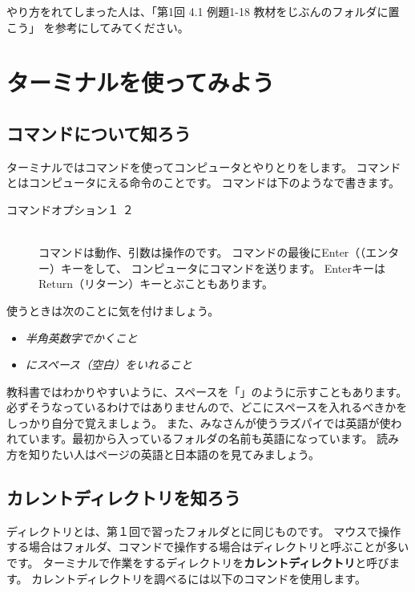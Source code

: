 やり方をれてしまった人は、「第1回 4.1 例題1-18 教材をじぶんのフォルダに置こう」 を参考にしてみてください。

\section{ターミナルを使ってみよう}
\subsection{コマンドについて知ろう}

ターミナルではコマンドを使ってコンピュータとやりとりをします。
コマンドとはコンピュータにえる命令のことです。
コマンドは下のようなで書きます。

\begin{description}
\item[コマンド\textvisiblespace オプション\textvisiblespace {}１\textvisiblespace 
{}２]\mbox{}\\
コマンドは動作、引数は操作のです。
 コマンドの最後にEnter（（エンター）キーをして、
 コンピュータにコマンドを送ります。
 EnterキーはReturn（リターン）キーとぶこともあります。
\end{description}

使うときは次のことに気を付けましょう。
\begin{itemize}
\item \emph{半角英数字でかくこと}
\item \emph{にスペース（空白）をいれること}
\end{itemize}


教科書ではわかりやすいように、スペースを「\textvisiblespace 」のように示すこともあります。
必ずそうなっているわけではありませんので、どこにスペースを入れるべきかをしっかり自分で覚えましょう。
また、みなさんが使うラズパイでは英語が使われています。最初から入っているフォルダの名前も英語になっています。
読み方を知りたい人は\pageref{英語と日本語の対応表}ページの英語と日本語のを見てみましょう。

\subsection{カレントディレクトリを知ろう}
ディレクトリとは、第１回で習ったフォルダとに同じものです。
マウスで操作する場合はフォルダ、コマンドで操作する場合はディレクトリと呼ぶことが多いです。
ターミナルで作業をするディレクトリを{\bf カレントディレクトリ}と呼びます。
カレントディレクトリを調べるには以下のコマンドを使用します。

